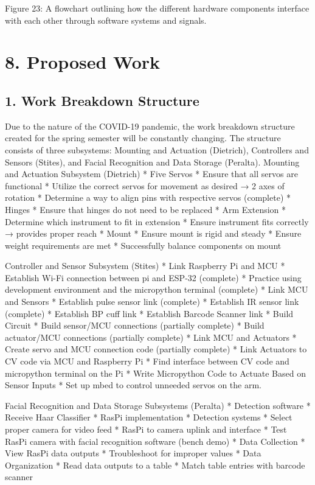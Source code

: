 ﻿\documentclass[10pt]{article}
\begin{document}
Figure 23: A flowchart outlining how the different hardware components interface with each other through software systems and signals.

\section{8. Proposed Work}
\subsection{1. Work Breakdown Structure}
Due to the nature of the COVID-19 pandemic, the work breakdown structure created for the spring semester will be constantly changing. The structure consists of three subsystems: Mounting and Actuation (Dietrich), Controllers and Sensors (Stites), and Facial Recognition and Data Storage (Peralta).  
Mounting and Actuation Subsystem (Dietrich)
* Five Servos
   * Ensure that all servos are functional
   * Utilize the correct servos for movement as desired → 2 axes of rotation
   * Determine a way to align pins with respective servos (complete)
* Hinges
   * Ensure that hinges do not need to be replaced
* Arm Extension
   * Determine which instrument to fit in extension
   * Ensure instrument fits correctly → provides proper reach
* Mount
   * Ensure mount is rigid and steady 
   * Ensure weight requirements are met
   * Successfully balance components on mount

Controller and Sensor Subsystem (Stites)
* Link Raspberry Pi and MCU
   * Establish Wi-Fi connection between pi and ESP-32 (complete)
   * Practice using development environment and the micropython terminal (complete)
* Link MCU and Sensors
   * Establish pulse sensor link (complete)
   * Establish IR sensor link (complete)
   * Establish BP cuff link
   * Establish Barcode Scanner link
* Build Circuit
   * Build sensor/MCU connections (partially complete)
   * Build actuator/MCU connections (partially complete)
* Link MCU and Actuators
   * Create servo and MCU connection code (partially complete)
* Link Actuators to CV code via MCU and Raspberry Pi
   * Find interface between CV code and micropython terminal on the Pi
* Write Micropython Code to Actuate Based on Sensor Inputs
   * Set up mbed to control unneeded servos on the arm. 

Facial Recognition and Data Storage Subsystems (Peralta)
* Detection software
   * Receive Haar Classifier
   * RasPi implementation
* Detection systems
   * Select proper camera for video feed
   * RasPi to camera uplink and interface
   * Test RasPi camera with facial recognition software (bench demo)
* Data Collection
   * View RasPi data outputs
   * Troubleshoot for improper values
* Data Organization
   * Read data outputs to a table
   * Match table entries with barcode scanner
\end{document}
